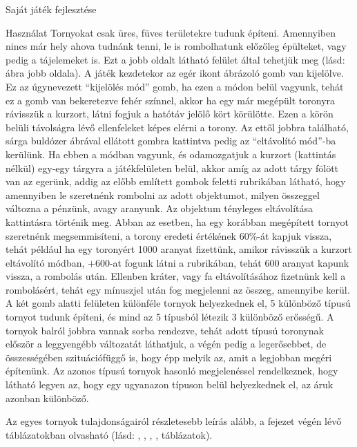 \begin{MyChapter}{Saját játék fejlesztése}
\begin{MySection}{Használat}
		Tornyokat csak üres, füves területekre tudunk építeni. Amennyiben nincs már hely ahova tudnánk tenni, le is rombolhatunk előzőleg épülteket, vagy pedig a tájelemeket is. Ezt a jobb oldalt látható felület által tehetjük meg (lásd:  ábra jobb oldala).		
		A játék kezdetekor az egér ikont ábrázoló gomb van kijelölve. Ez az úgynevezett ``kijelölés mód'' gomb, ha ezen a módon belül vagyunk, tehát ez a gomb van bekeretezve fehér színnel, akkor ha egy már megépült toronyra rávisszük a kurzort, látni fogjuk a hatótáv jelölő kört körülötte. Ezen a körön belüli távolságra lévő ellenfeleket képes elérni a torony. %
		Az ettől jobbra található, sárga buldózer ábrával ellátott gombra kattintva pedig az ``eltávolító mód''-ba kerülünk. Ha ebben a módban vagyunk, és odamozgatjuk a kurzort (kattintás nélkül) egy-egy tárgyra a játékfelületen belül, akkor amíg az adott tárgy fölött van az egerünk, addig az előbb említett gombok feletti rubrikában látható, hogy amennyiben le szeretnénk rombolni az adott objektumot, milyen összeggel változna a pénzünk, avagy aranyunk. Az objektum tényleges eltávolítása kattintásra történik meg.
		Abban az esetben, ha egy korábban megépített tornyot szeretnénk megsemmisíteni, a torony eredeti értékének 60\%-át kapjuk vissza, tehát például ha egy toronyért 1000 aranyat fizettünk, amikor rávisszük a kurzort eltávolító módban, $+600$-at fogunk látni a rubrikában, tehát 600 aranyat kapunk vissza, a rombolás után. Ellenben kráter, vagy fa eltávolításához fizetnünk kell a rombolásért, tehát egy mínuszjel után fog megjelenni az összeg, amennyibe kerül.
		A két gomb alatti felületen különféle tornyok helyezkednek el, 5 különböző típusú tornyot tudunk építeni, és mind az 5 típusból létezik 3 különböző erősségű.
		A tornyok balról jobbra vannak sorba rendezve, tehát adott típusú toronynak először a leggyengébb változatát láthatjuk, a végén pedig a legerősebbet, de összességében szituációfüggő is, hogy épp melyik az, amit a legjobban megéri építenünk. Az azonos típusú tornyok hasonló megjelenéssel rendelkeznek, hogy látható legyen az, hogy egy ugyanazon típuson belül helyezkednek el, az áruk azonban különböző.
		
		Az egyes tornyok tulajdonságairól részletesebb leírás alább, a fejezet végén lévő táblázatokban olvasható (lásd: , , , ,  táblázatok).
		

\end{MySection}
\end{MyChapter}
